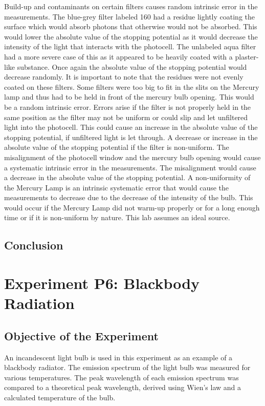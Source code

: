 \documentclass[a4paper]{article}
\begin{document}
\qq Build-up and contaminants on certain filters causes random
intrinsic error in the measurements. The blue-grey filter labeled 160
had a residue lightly coating the surface which would absorb photons
that otherwise would not be absorbed. This would lower the absolute
value of the stopping potential as it would decrease the intensity of
the light that interacts with the photocell. The unlabeled aqua filter
had a more severe case of this as it appeared to be heavily coated
with a plaster-like substance. Once again the absolute value of the
stopping potential would decrease randomly. It is important to note
that the residues were not evenly coated on these filters. Some
filters were too big to fit in the slits on the Mercury lamp and thus
had to be held in front of the mercury bulb opening. This would be a
random intrinsic error. Errors arise if the filter is not properly
held in the same position as the filter may not be uniform or could
slip and let unfiltered light into the photocell. This could cause an
increase in the absolute value of the stopping potential, if
unfiltered light is let through. A decrease or increase in the
absolute value of the stopping potential if the filter is
non-uniform. The misalignment of the photocell window and the mercury
bulb opening would cause a systematic intrinsic error in the
measurements. The misalignment would cause a decrease in the absolute
value of the stopping potential. A non-uniformity of the Mercury Lamp
is an intrinsic systematic error that would cause the measurements to
decrease due to the decrease of the intensity of the bulb. This would
occur if the Mercury Lamp did not warm-up properly or for a long
enough time or if it is non-uniform by nature. This lab assumes an
ideal source.

\subsection{Conclusion}

\qq %

\section{Experiment P6: Blackbody Radiation}

\subsection{Objective of the Experiment}
\qq An incandescent light bulb is used in this experiment as an example of a blackbody radiator. The emission spectrum of the light bulb was measured for various temperatures. The peak wavelength of each emission spectrum was compared to a theoretical peak wavelength, derived using Wien's law and a calculated temperature of the bulb.
\end{document}
